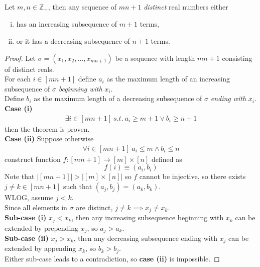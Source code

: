 \documentclass{article}
\def\Z{{\mathbb Z}}
\begin{document}
			\begin{theorem}
				Let $m, n \in \Z_+$, then any sequence of $mn + 1$ \emph{distinct} real numbers either
				\begin{enumerate}[(i)]
					\item has an increasing subsequence of $m+1$ terms,
					\item or it has a decreasing subsequence of $n+1$ terms.
				\end{enumerate}
				\begin{proof}
					Let $\sigma = (x_1, x_2, \dots, x_{mn+1})$ be a sequence with length $mn+1$ consisting of distinct reals.\\
					For each $i \in [mn+1]$ define $a_i$ as the maximum length of an increasing subsequence of $\sigma$ \emph{beginning with} $x_i$. \\
					Define $b_i$ as the maximum length of a decreasing subsequence of $\sigma$ \emph{ending with} $x_i$. \\
					\textbf{Case (i)}
					\begin{gather}
						\exists i \in [mn+1]\ s.t.\ a_i \geq m+1 \lor b_i \geq n+1
					\end{gather}
					then the theorem is proven. \\
					\textbf{Case (ii)} Suppose otherwise
					\begin{gather}
						\forall i \in [mn+1]\ a_i \leq m \land b_i \leq n
					\end{gather}
					construct function $f: [mn+1] \to [m]\times[n]$ defined as
					\begin{equation}
						f(i) \equiv (a_i, b_i)
					\end{equation}
					Note that $|[mn+1]| > |[m]\times[n]|$ so $f$ cannot be injective, so there exists $j\neq k \in [mn+1]$ such that $(a_j, b_j) = (a_k, b_k)$. \\
					WLOG, assume $j < k$.\\
					Since all elements in $\sigma$ are distinct, $j \neq k \implies x_j \neq x_k$. \\
					\textbf{Sub-case (i)} $x_j < x_k$, then any increasing subsequence beginning with $x_k$ can be extended by prepending $x_j$, so $a_j > a_k$. \\
					\textbf{Sub-case (ii)} $x_j > x_k$, then any decreasing subsequence ending with $x_j$ can be extended by appending $x_k$, so $b_k > b_j$. \\
					Either sub-case leads to a contradiction, so \textbf{case (ii)} is impossible.
				\end{proof}
			\end{theorem}
\end{document}
